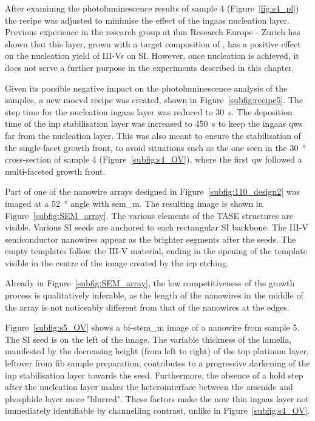 After examining the photoluminescence results of sample 4 (Figure~\ref{fig:s4_pl}) the recipe was adjusted to minimise the effect of the \acs{ingaas} nucleation layer. Previous experience in the research group at \acs{ibm} Research Europe - Zurich has shown that this layer, grown with a target composition of , has a positive effect on the nucleation yield of III-Vs on \acl{SI}. However, once nucleation is achieved, it does not serve a further purpose in the experiments described in this chapter. 

Given its possible negative impact on the photoluminescence analysis of the samples, a new \acf{mocvd} recipe was created, shown in Figure~\ref{subfig:recipe5}. The step time for the nucleation \acs{ingaas} layer was reduced to \qty{30}{\second}. The deposition time of the \acs{inp} stabilisation layer was increased to \qty{450}{\second} to keep the \acs{ingaas} \acl{qw}s far from the nucleation layer. This was also meant to ensure the stabilisation of the single-facet  growth front, to avoid situations such as the one seen in the \qty{30}{\degree} cross-section of sample 4 (Figure~\ref{subfig:s4_OV}), where the first \acl{qw} followed a multi-faceted growth front. 

Part of one of the nanowire arrays designed in Figure~\ref{subfig:110_design2} was imaged at a \qty{52}{\degree} angle with \acs{sem_m}. The resulting image is shown in Figure~\ref{subfig:SEM_array}. The various elements of the \acs{TASE} structures are visible. Various \acl{SI} seeds are anchored to each rectangular \acl{SI} backbone. The III-V semiconductor nanowires appear as the brighter segments after the seeds. The empty templates follow the III-V material, ending in the opening of the template visible in the centre of the image created by the \acf{icp} etching. 

Already in Figure~\ref{subfig:SEM_array}, the low competitiveness of the growth process is qualitatively inferable, as the length of the nanowires in the middle of the array is not noticeably different from that of the nanowires at the edges.

Figure~\ref{subfig:s5_OV} shows a \acs{bf}-\acs{stem_m} image of a nanowire from sample 5. The \acl{SI} seed is on the left of the image. The variable thickness of the lamella, manifested by the decreasing height (from left to right) of the top platinum layer, leftover from \acs{fib} sample preparation, contributes to a progressive darkening of the \acs{inp} stabilisation layer towards the seed. Furthermore, the absence of a hold step after the nucleation layer makes the heterointerface between the arsenide and phosphide layer more "blurred". These factors make the now thin \acs{ingaas} layer not immediately identifiable by channelling contrast, unlike in Figure~\ref{subfig:s4_OV}.

